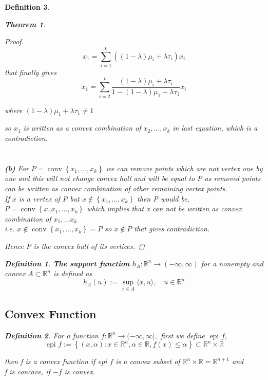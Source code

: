 \documentclass[oneside]{book}
\newtheorem{theorem}{Theorem}[section]
\newtheorem{mydef}{Definition}
\begin{document}
\begin{mydef}
\begin{theorem}
\begin{proof}
\begin{equation} 
\label{eq38}
x_{1}=\sum_{i=1}^{k}\left((1-\lambda) \mu_{i}+\lambda \tau_{i}\right) x_{i}
\end{equation}
that finally gives 
\begin{equation} 
\label{eq39}
x_{1}=\sum_{i=2}^{k} \frac{(1-\lambda) \mu_{i}+\lambda \tau_{i}}{1-(1-\lambda) \mu_{1}-\lambda \tau_{1}} x_{i}
\end{equation}

where $(1-\lambda) \mu_{1}+\lambda \tau_{1} \neq 1$ \par
 so $x_{1}$ is written as a convex combination of $x_{2}, \ldots, x_{k}$ in last equation, which is  a contradiction.
\\\\\\
\textbf{(b)}  For $P=\operatorname{conv}\left\{x_{1}, \ldots, x_{k}\right\}$ we can remove points  which are not vertex  
one by one and this will not change convex hull and will be equal to P as removed points can be written as convex combination of other remaining vertex points. \\
If $x$ is a vertex of P but $x \notin \left\{x_{1}, \ldots, x_{k}\right\} $ then P would be,
$P=\operatorname{conv}\left\{x,x_{1}, \ldots, x_{k}\right\}$ 
which implies that x can not be written as convex combination of $x_{1}, \ldots x_{k}$ \\ i.e. 
 $x \notin  \operatorname{conv} \left\{x_{1}, \ldots, x_{k}\right\} = P  $ so $x \notin P$ that gives contradiction.\par
 Hence P is the convex hull of its vertices.
\end{proof}


\end{theorem}


\begin{mydef}\label{d:8}
 \textbf{The support function }$h_{A}: \mathbb{R}^{n} \rightarrow(-\infty, \infty) $  for a nonempty and convex $A \subset \mathbb{R}^{n}$ is defined as
$$
h_{A}(u):=\sup _{x \in A}\langle x, u\rangle, \quad u \in \mathbb{R}^{n}
$$

\end{mydef}



\subsection{Convex Function}
\label{ss:17}


\begin{mydef} \label{d:9}
For a function   $f: \mathbb{R}^{n} \rightarrow(-\infty, \infty],$ first we define $\text { epi } f, $  
\begin{equation}
\label{eq40}
\text { epi } f:=\left\{(x, \alpha): x \in \mathbb{R}^{n}, \alpha \in \mathbb{R}, f(x) \leq \alpha\right\} \subset \mathbb{R}^{n} \times \mathbb{R} 
\end{equation}
\end{mydef}
  then f is a convex function if epi $f$ is a convex subset of $\mathbb{R}^{n} \times \mathbb{R}=\mathbb{R}^{n+1}$  and \\  f is concave, if $-f$ is convex. 
  

\end{mydef}
\end{document}
